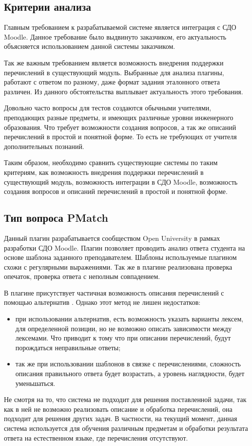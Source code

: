 \documentclass[a4paper,english,russian]{G2-105}
\begin{document}
\subsection{Критерии анализа}

\par Главным требованием к разрабатываемой системе является интеграция с СДО Moodle. Данное требование было выдвинуто заказчиком, его актуальность объясняется использованием данной системы заказчиком.
\par Так же важным требованием является возможность внедрения поддержки перечислений в существующий модуль. Выбранные для анализа плагины, работают с ответом по разному, даже формат задания эталонного ответа различен. Из данного обстоятельства выплывает актуальность этого требования.
\par Довольно часто вопросы для тестов создаются обычными учителями, преподающих разные предметы, и имеющих различные уровни инженерного образования. Что требует возможности создания вопросов, а так же описаний перечислений в простой и понятной форме. То есть не требующих от учителя дополнительных познаний.
\par Таким образом, необходимо сравнить существующие системы по таким критериям, как возможность внедрения поддержки перечислений в существующий модуль, возможность интеграции в СДО Moodle, возможность создания вопросов и описаний перечислений в простой и понятной форме.  

\subsection{Тип вопроса PMatch}

\par Данный плагин разрабатывается сообществом Open University в рамках разработки СДО Moodle. Плагин позволяет проводить анализ ответа студента на основе шаблона заданного преподавателем. Шаблоны используемые плагином схожи с регулярными выражениями. Так же в плагине реализована проверка опечаток, проверка ответа с неполным совпадением.
\par В плагине присутствует частичная возможность описания перечислений с помощью альтернатив \cite{1}. Однако этот метод не лишен недостатков: 
\begin{itemize}
    \item при использовании альтернатив, есть возможность указать варианты лексем, для определенной позиции, но не возможно описать зависимости между лексемами. Что приводит к тому что при описании перечислений, будут порождаться неправильные ответы;
    \item так же при использовании шаблонов в связке с перечислениями, сложность описания правильного ответа будет возрастать, а уровень наглядности, будет уменьшаться.
\end{itemize}
\par Не смотря на то, что система не подходит для решения поставленной задачи, так как в ней не возможно реализовать описание и обработка перечислений, она подходит для решения других задач. В частности, на текущий момент, данная система используется для обучения различным предметам и обработки результата ответа на естественном языке, где перечисления отсутствуют. 
\end{document}
